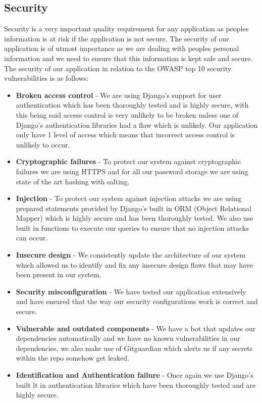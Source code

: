 \documentclass[12pt]{article}
\begin{document}
\newpage
\subsection{Security}
Security is a very important quality requirement for any application as peoples information is at risk if the application is not secure. The security of our application is of utmost importance as we are dealing with peoples personal information and we need to ensure that this information is kept safe and secure. The security of our application in relation to the OWASP top 10 security vulnerabilities is as follows:
\begin{itemize}
    \item \textbf{Broken access control} - We are using Django's support for user authentication which has been thoroughly tested and is highly secure, with this being said access control is very unlikely to be broken unless one of Django's authentication libraries had a flaw which is unlikely. Our application only have 1 level of access which means that incorrect access control is unlikely to occur.
    \item \textbf{Cryptographic failures} - To protect our system against cryptographic failures we are using HTTPS and for all our password storage we are using state of the art hashing with salting.
    \item \textbf{Injection} - To protect our system against injection attacks we are using prepared statements provided by Django's built in ORM (Object Relational Mapper) which is highly secure and has been thoroughly tested. We also use built in functions to execute our queries to ensure that no injection attacks can occur.
    \item \textbf{Insecure design} - We consistently update the architecture of our system which allowed us to identify and fix any insecure design flaws that may have been present in our system.
    \item \textbf{Security misconfiguration} - We have tested our application extensively and have ensured that the way our security configurations work is correct and secure.
    \item \textbf{Vulnerable and outdated components} - We have a bot that updates our dependencies automatically and we have no known vulnerabilities in our dependencies, we also make use of Gitguardian which alerts us if any secrets within the repo somehow get leaked.
    \item \textbf{Identification and Authentication failure} - Once again we use Django's built lt in authentication libraries which have been thoroughly tested and are highly secure.

\end{itemize}
\end{document}
